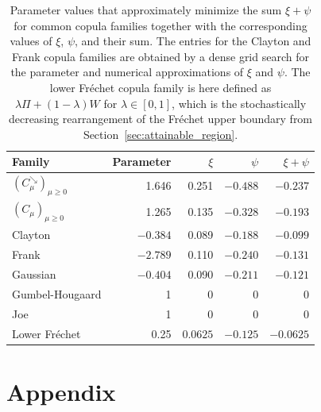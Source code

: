 \documentclass{article}
\newcommand{\1}{\mathds{1}}
\begin{document}
\begin{table}[ht!]
  \centering
  \begin{tabular}{lrrrr}
    \toprule
    Family & Parameter & $\xi$ & $\psi$ & $\xi+\psi$ \\
    \midrule
    $(C^{\searrow}_\mu)_{\mu\ge0}$        &  1.646 & 0.251 & $-0.488$ &    $-0.237$ \\
    $(C_\mu)_{\mu\ge0}$        &  1.265 & 0.135 & $-0.328$ &    $-0.193$ \\
    Clayton        &     $-0.384$ &      0.089 &     $-0.188$ &     $-0.099$ \\
    Frank          &     $-2.789$ &      0.110 &     $-0.240$ &     $-0.131$ \\
    Gaussian       &     $-0.404$ &      0.090 &     $-0.211$ &     $-0.121$ \\
    Gumbel-Hougaard&      1 &      0 &      0 &      0 \\
    Joe            &      1 &      0 &      0 &      0 \\
    Lower Fréchet  &  0.25 & $0.0625$ & $-0.125$ &    $-0.0625$ \\
    \bottomrule
  \end{tabular}
  \caption{
  Parameter values that approximately minimize the sum $\xi+\psi$ for common copula families together with the corresponding values of $\xi$, $\psi$, and their sum.
  The entries for the Clayton and Frank copula families are obtained by a dense grid search for the parameter and numerical approximations of $\xi$ and $\psi$.
  The lower Fréchet copula family is here defined as $\lambda \Pi + (1-\lambda) W$ for $\lambda\in[0,1]$, which is the stochastically decreasing rearrangement of the Fréchet upper boundary from Section~\ref{sec:attainable_region}.
  }
  \label{tab:footrule_plus_xi_min}
\end{table}


\appendix
\section{Appendix}
\end{document}
